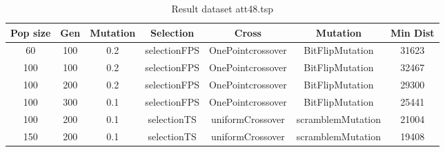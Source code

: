 \documentclass[12pt]{report}
\begin{document}
    \begin{table}
        \centering
        \begin{tabular}{|c|c|c|c|c|c|c|}
            \hline
            Pop size & Gen & Mutation & Selection & Cross & Mutation & Min Dist\\
            \hline
            60 & 100 & 0.2 & selectionFPS & OnePointcrossover & BitFlipMutation & 31623 \\
            \hline
            100 & 100 & 0.2 & selectionFPS & OnePointcrossover & BitFlipMutation & 32467 \\
            \hline
            100 & 200 & 0.2 & selectionFPS & OnePointcrossover & BitFlipMutation & 29300\\
            \hline
            100 & 300 & 0.1 & selectionFPS & OnePointcrossover & BitFlipMutation & 25441 \\
            \hline
            100 & 200 & 0.1 & selectionTS & uniformCrossover & scramblemMutation & 21004 \\
            \hline
            150 & 200 & 0.1 & selectionTS & uniformCrossover & scramblemMutation & 19408 \\
            \hline
            \end{tabular}
        \caption{Result dataset att48.tsp}
        \label{resultsatt48}
    \end{table}
\end{document}
